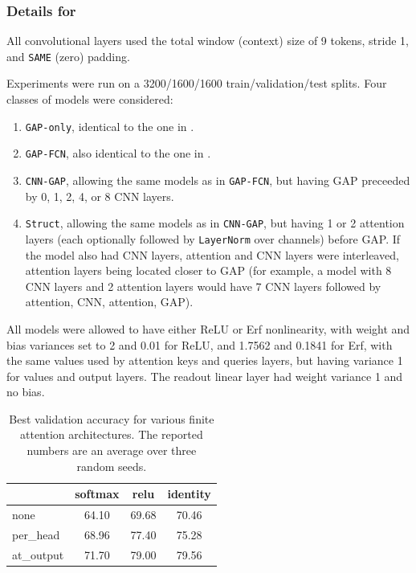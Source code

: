 \subsubsection{Details for }\label{sect:imdb_small_appendix}
    All convolutional layers used the total window (context) size of 9 tokens, stride 1, and \texttt{SAME} (zero) padding.
    
    Experiments were run on a 3200/1600/1600 train/validation/test splits. Four classes of models were considered:
    \begin{enumerate}
        \item \texttt{GAP-only}, identical to the one in .
        \item \texttt{GAP-FCN}, also identical to the one in .
        \item \texttt{CNN-GAP}, allowing the same models as in \texttt{GAP-FCN}, but having GAP preceeded by 0, 1, 2, 4, or 8 CNN layers.
        \item \texttt{Struct}, allowing the same models as in \texttt{CNN-GAP}, but having 1 or 2 attention layers (each optionally followed by \texttt{LayerNorm} over channels) before GAP. If the model also had CNN layers, attention and CNN layers were interleaved, attention layers being located closer to GAP (for example, a model with 8 CNN layers and 2 attention layers would have 7 CNN layers followed by attention, CNN, attention, GAP).
    \end{enumerate}
    All models were allowed to have either ReLU or Erf nonlinearity, with weight and bias variances set to 2 and 0.01 for ReLU, and 1.7562 and 0.1841 for Erf, with the same values used by attention keys and queries layers, but having variance 1 for values and output layers. The readout linear layer had weight variance 1 and no bias.


\begin{table}[htbp]
\caption{Best validation accuracy for various finite attention architectures. The reported numbers are an average over three random seeds.}
\label{tab:finite_attention_best}
\vskip 0.15in
\begin{center}
\begin{small}
\begin{sc}
\begin{tabular}{lccc}
    \toprule
     & softmax & relu & identity \\
    \midrule
    none    &  64.10  & 69.68  & 70.46 \\
    per\_head   &  68.96 & 77.40  & 75.28   \\
    at\_output   & 71.70 & 79.00  & 79.56 \\
    \bottomrule
\end{tabular}
\end{sc}
\end{small}
\end{center}
\vskip -0.18in
\end{table}



